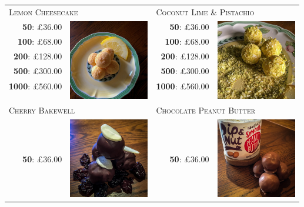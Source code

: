 \documentclass[11pt, english]{article}
\begin{document}
	\begin{table}[h]
	\begin{center}
	\begin{tabular}{r|p{4cm}r|p{4cm}}
		\multicolumn{2}{l}{\textsc{Lemon Cheesecake}} & \multicolumn{2}{l}{\textsc{Coconut Lime \& Pistachio}}\\
		\textbf{50}: \pounds36.00 & \multirow{8}{*}{\includegraphics[width=3.5cm,height=3.5cm]{../Photos_Shop/img_truffle11.jpg}} & \textbf{50}: \pounds36.00 & \multirow{8}{*}{\includegraphics[width=3.5cm,height=3.5cm]{../Photos_Shop/img_truffle2.jpg}}\\
		\textbf{100}: \pounds68.00 & & \textbf{100}: \pounds68.00 & \\
		\textbf{200}: \pounds128.00 & & \textbf{200}: \pounds128.00 & \\
		\textbf{500}: \pounds300.00 & & \textbf{500}: \pounds300.00 & \\
		\textbf{1000}: \pounds560.00 & & \textbf{1000}: \pounds560.00 & \\
		\multicolumn{4}{l}{}\\
		\multicolumn{4}{l}{}\\
		\multicolumn{4}{l}{}\\
		\multicolumn{2}{l}{\textsc{Cherry Bakewell}} & \multicolumn{2}{l}{\textsc{Chocolate Peanut Butter}}\\
		\textbf{50}: \pounds36.00 & \multirow{5}{*}{\includegraphics[width=3.5cm,height=3.5cm]{../Photos_Shop/img_truffle12.jpg}} & \textbf{50}: \pounds36.00 & \multirow{5}{*}{\includegraphics[width=3.5cm,height=3.5cm]{../Photos_Shop/img_truffle13.jpg}}\\

\end{tabular}
\end{center}
\end{table}
\end{document}
